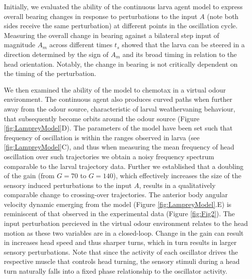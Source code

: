 \documentclass[10pt,a4paper]{article}
\begin{document}
Initially, we evaluated the ability of the continuous larva agent model to express overall bearing changes in response to perturbations to the input $A$ (note both sides receive the same perturbation) at different points in the oscillation cycle. Measuring the overall change in bearing against a bilateral step input of magnitude $A_m$ across different times $t_s$ showed that the larva can be steered in a direction determined by the sign of $A_m$ and its broad timing in relation to the head orientation.
Notably, the change in bearing is not critically dependent on the timing of the perturbation. 


We then examined the ability of the model to chemotax in a virtual odour environment. The continuous agent also produces curved paths when further away from the odour source, characteristic of larval weathervaning behaviour, that subsequently become orbits around the odour source (Figure \ref{fig:LampreyModel}D). The parameters of the model have been set such that frequency of oscillation is within the ranges observed in larva (see \ref{fig:LampreyModel}C), and thus when measuring the mean frequency of head oscillation over such trajectories we obtain a noisy frequency spectrum comparable to the larval trajectory data. Further we established that a doubling of the gain (from $G=70$ to $G=140$), which effectively increases the size of the sensory induced perturbations to the input $A$, results in a qualitatively comparable change to crossing-over trajectories. The anterior body angular velocity dynamic emerging from the model (Figure \ref{fig:LampreyModel}.E) is reminiscent of that observed in the experimental data (Figure \ref{fig:Fig2}). The input perturbation percieved in the virtual odour environment relates to the head motion as these two variables are in a closed-loop. Change in the gain can result in increases head speed and thus sharper turns, which in turn results in larger sensory perturbations. Note that since the activity of each oscillator drives the respective muscle that controls head turning, the sensory stimuli during a head turn naturally falls into a fixed phase relationship to the oscillator activity.
\end{document}
